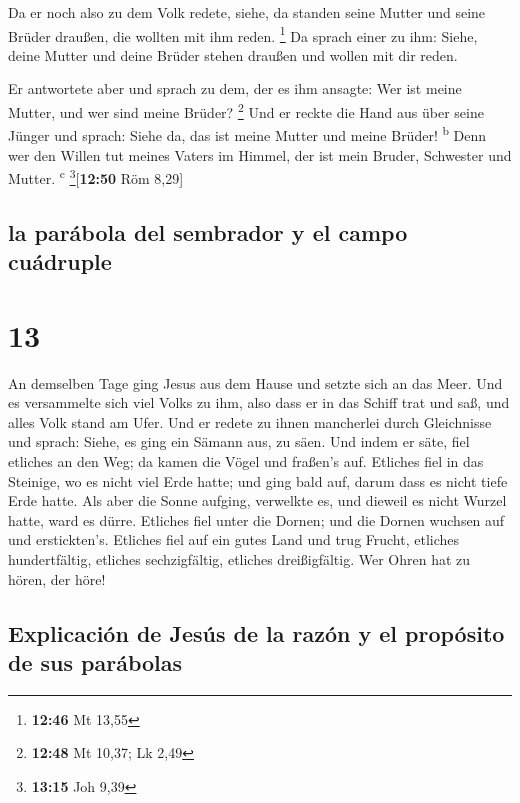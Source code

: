  Da er noch also zu dem Volk redete, siehe, da standen
seine Mutter und seine Brüder draußen, die wollten mit ihm reden.
\footnote{\textbf{12:46} Mt 13,55}  Da sprach einer zu
ihm: Siehe, deine Mutter und deine Brüder stehen draußen und wollen mit
dir reden.

 Er antwortete aber und sprach zu dem, der es ihm
ansagte: Wer ist meine Mutter, und wer sind meine Brüder? \footnote{\textbf{12:48}
  Mt 10,37; Lk 2,49}  Und er reckte die Hand aus über
seine Jünger und sprach: Siehe da, das ist meine Mutter und meine
Brüder! \textsuperscript{b}  Denn wer den Willen tut
meines Vaters im Himmel, der ist mein Bruder, Schwester und Mutter.
\textsuperscript{c} \footnote{\textbf{13:15} Joh 9,39}{[}\textbf{12:50}
Röm 8,29{]}

\hypertarget{la-paruxe1bola-del-sembrador-y-el-campo-cuuxe1druple}{%
\subsection{la parábola del sembrador y el campo
cuádruple}\label{la-paruxe1bola-del-sembrador-y-el-campo-cuuxe1druple}}

\hypertarget{section-12}{%
\section{13}\label{section-12}}

 An demselben Tage ging Jesus aus dem Hause und setzte
sich an das Meer.  Und es versammelte sich viel Volks zu
ihm, also dass er in das Schiff trat und saß, und alles Volk stand am
Ufer.  Und er redete zu ihnen mancherlei durch Gleichnisse
und sprach: Siehe, es ging ein Sämann aus, zu säen.  Und
indem er säte, fiel etliches an den Weg; da kamen die Vögel und fraßen's
auf.  Etliches fiel in das Steinige, wo es nicht viel Erde
hatte; und ging bald auf, darum dass es nicht tiefe Erde hatte.
 Als aber die Sonne aufging, verwelkte es, und dieweil es
nicht Wurzel hatte, ward es dürre.  Etliches fiel unter
die Dornen; und die Dornen wuchsen auf und erstickten's. 
Etliches fiel auf ein gutes Land und trug Frucht, etliches
hundertfältig, etliches sechzigfältig, etliches dreißigfältig.
 Wer Ohren hat zu hören, der höre!

\hypertarget{explicaciuxf3n-de-jesuxfas-de-la-razuxf3n-y-el-propuxf3sito-de-sus-paruxe1bolas}{%
\subsection{Explicación de Jesús de la razón y el propósito de sus
parábolas}\label{explicaciuxf3n-de-jesuxfas-de-la-razuxf3n-y-el-propuxf3sito-de-sus-paruxe1bolas}}

